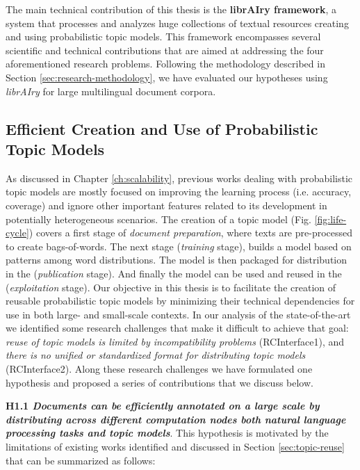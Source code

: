 The main technical contribution of this thesis is the \textbf{librAIry framework}, a system that processes and analyzes huge collections of textual resources creating and using probabilistic topic models. This framework encompasses several scientific and technical contributions that are aimed at addressing the four aforementioned research problems. Following the methodology described in Section \ref{sec:research-methodology}, we have evaluated our hypotheses using \textit{librAIry} for large multilingual document corpora. 

\subsection{Efficient Creation and Use of Probabilistic Topic Models}

As discussed in Chapter \ref{ch:scalability}, previous works dealing with probabilistic topic models are mostly focused on improving the learning process (i.e. accuracy, coverage) and ignore other important features related to its development in potentially heterogeneous scenarios. The creation of a topic model (Fig. \ref{fig:life-cycle}) covers a first stage of \textit{document preparation}, where texts are pre-processed to create bags-of-words. The next stage (\textit{training} stage),  builds a model based on patterns among word distributions. The model is then packaged for distribution in the (\textit{publication} stage). And finally the model can be used and reused in the (\textit{exploitation} stage). Our objective in this thesis is to facilitate the creation of reusable probabilistic topic models by minimizing their technical dependencies for use in both large- and small-scale contexts. In our analysis of the state-of-the-art we identified some research challenges that make it difficult to achieve that goal:  \textit{reuse of topic models is limited by incompatibility problems} (RCInterface1), and \textit{there is no unified or standardized format for distributing topic models} (RCInterface2). Along these research challenges we have formulated one hypothesis and proposed a series of contributions that we discuss below.

\textbf{H1.1 \textit{Documents can be efficiently annotated on a large scale by distributing across different computation nodes both natural language processing tasks and topic models}}. This hypothesis is motivated by the limitations of existing works identified and discussed in Section \ref{sec:topic-reuse} that can be summarized as follows:

